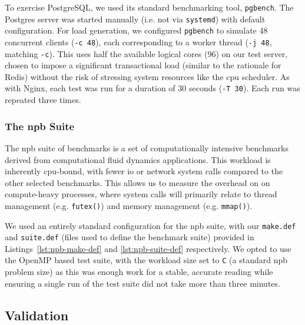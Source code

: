 To exercise PostgreSQL, we used its standard benchmarking tool, 
\texttt{pgbench}. The Postgres server was started manually (i.e. not via
\texttt{systemd}) with default configuration. For load generation, we configured 
\texttt{pgbench} to simulate 48 concurrent clients (\texttt{-c 48}), each
corresponding to a worker thread (\texttt{-j 48}, matching \texttt{-c}).
This uses half the available logical cores (96) on our
test server, chosen to impose a significant transactional load (similar to
the rationale for Redis) without the risk of stressing system resources like the
\ac{cpu} scheduler. As with Nginx, each test was run for a duration of 30
seconds (\texttt{-T 30}). Each run was repeated three times.

\subsubsection{The \ac{npb} Suite}\label{subsubsec:npb-just}

The \acl{npb} suite of benchmarks is a set of computationally intensive 
benchmarks derived from computational fluid dynamics applications. This 
workload is inherently \ac{cpu}-bound, with fewer \ac{io} or network system calls
compared to the other selected benchmarks. This allows us to measure the
overhead on \af on compute-heavy processes, where system calls will primarily relate
to thread management (e.g. \texttt{futex()}) and memory management (e.g. 
\texttt{mmap()}).

We used an entirely standard configuration for the \ac{npb} suite, with our
\texttt{make.def} and \texttt{suite.def} (files used to define the benchmark
suite) provided in Listings~\ref{lst:npb-make-def} and \ref{lst:npb-suite-def}
respectively. We opted to use the OpenMP based test suite, with the workload 
size set to \texttt{C} (a standard \ac{npb} problem size) as this was enough 
work for a stable, accurate reading while ensuring a single run of the test 
suite did not take more than three minutes.


\subsection{Validation}


